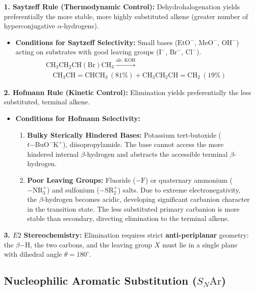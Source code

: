 \documentclass[10pt,twoside,openright]{book}
\begin{document}
\begin{formulabox}
\textbf{1. Saytzeff Rule (Thermodynamic Control):} Dehydrohalogenation yields preferentially the more stable, more highly substituted alkene (greater number of hyperconjugative $\alpha$-hydrogens).
\begin{itemize}
  \item \textbf{Conditions for Saytzeff Selectivity:} Small bases ($\mathrm{EtO}^-$, $\mathrm{MeO}^-$, $\mathrm{OH}^-$) acting on substrates with good leaving groups ($\mathrm{I}^-$, $\mathrm{Br}^-$, $\mathrm{Cl}^-$).
  \begin{align}
    &\mathrm{CH_3CH_2CH(Br)CH_3} \xrightarrow{\mathrm{alc.\ KOH}} \nonumber\\
    &\quad \mathbf{\mathrm{CH_3CH=CHCH_3}} \ (81\%) + \mathrm{CH_3CH_2CH=CH_2} \ (19\%)
  \end{align}
\end{itemize}
\textbf{2. Hofmann Rule (Kinetic Control):} Elimination yields preferentially the less substituted, terminal alkene.
\begin{itemize}
  \item \textbf{Conditions for Hofmann Selectivity:}
  \begin{enumerate}
    \item \textbf{Bulky Sterically Hindered Bases:} Potassium tert-butoxide ($t\mathrm{-BuO^-K^+}$), diisopropylamide. The base cannot access the more hindered internal $\beta$-hydrogen and abstracts the accessible terminal $\beta$-hydrogen.
    \item \textbf{Poor Leaving Groups:} Fluoride ($-\mathrm{F}$) or quaternary ammonium ($-\mathrm{NR_3^+}$) and sulfonium ($-\mathrm{SR_2^+}$) salts. Due to extreme electronegativity, the $\beta$-hydrogen becomes acidic, developing significant carbanion character in the transition state. The less substituted primary carbanion is more stable than secondary, directing elimination to the terminal alkene.
  \end{enumerate}
\end{itemize}
\textbf{3. $E2$ Stereochemistry:} Elimination requires strict \textbf{anti-periplanar} geometry: the $\beta\mathrm{-H}$, the two carbons, and the leaving group $X$ must lie in a single plane with dihedral angle $\theta = 180^\circ$.
\end{formulabox}

\subsection{Nucleophilic Aromatic Substitution (\texorpdfstring{$S_N\mathrm{Ar}$}{SNAr})}
\end{document}
